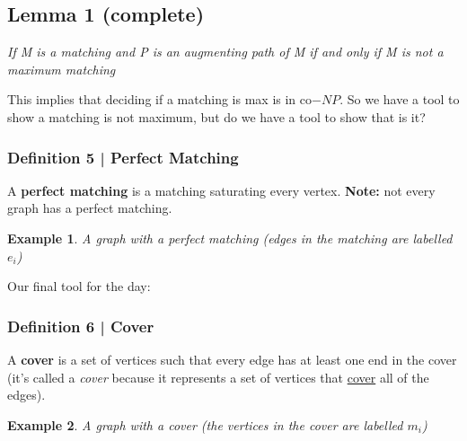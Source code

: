 \documentclass{report}
\newtheorem{ex}{Example}[section]
\begin{document}
\subsection{Lemma 1 (complete)}
\begin{center}
\textit{If M is a matching and P is an augmenting path of M if and only if M is not a maximum matching}
\end{center}
This implies that deciding if a matching is max is in co$-NP$. So we have a tool to show a matching is not maximum, but do we have a tool to show that is it?
\subsubsection{Definition 5 | Perfect Matching}
A \textbf{perfect matching} is a matching saturating every vertex. \textbf{Note:} not every graph has a perfect matching.
\begin{ex}
A graph with a perfect matching (edges in the matching are labelled $e_i$)
\end{ex}
\begin{center}
\end{center}
Our final tool for the day:
\subsubsection{Definition 6 | Cover}
A \textbf{cover} is a set of vertices such that every edge has at least one end in the cover (it's called a \textit{cover} because it represents a set of vertices that \underline{cover} all of the edges).
\begin{ex}
A graph with a cover (the vertices in the cover are labelled $m_i$)
\end{ex}
\begin{center}
\end{center}
\end{document}
